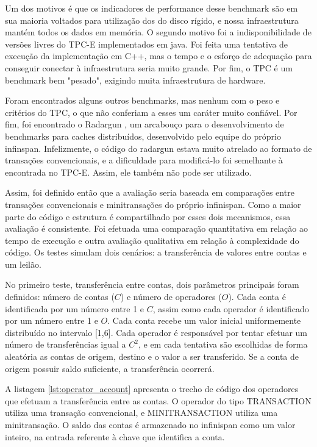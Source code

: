 \documentclass[11pt,twoside,a4paper]{book}
\begin{document}
Um dos motivos é que os indicadores de performance desse benchmark são em sua maioria voltados para utilização dos do disco rígido, e nossa infraestrutura mantém todos os dados em memória. O segundo motivo foi a indisponibilidade de versões livres do TPC-E implementados em java. Foi feita uma tentativa de execução da implementação em C++, mas o tempo e o esforço de adequação para conseguir conectar à infraestrutura seria muito grande. Por fim, o TPC é um benchmark bem "pesado", exigindo muita infraestrutura de hardware.

Foram encontrados alguns outros benchmarks, mas nenhum com o peso e critérios do TPC, o que não conferiam a esses um caráter muito confiável. Por fim, foi encontrado o Radargun \cite{radargun}, um arcabouço para o desenvolvimento de benchmarks para caches distribuídos, desenvolvido pelo equipe do próprio infinspan. Infelizmente, o código do radargun estava muito atrelado ao formato de transações convencionais, e a dificuldade para modificá-lo foi semelhante à encontrada no TPC-E. Assim, ele também não pode ser utilizado.

Assim, foi definido então que a avaliação seria baseada em comparações entre transações convencionais e minitransações do próprio infinispan. Como a maior parte do código e estrutura é compartilhado por esses dois mecanismos, essa avaliação é consistente. Foi efetuada uma comparação quantitativa em relação ao tempo de execução e outra avaliação qualitativa em relação à complexidade do código. Os testes simulam dois cenários: a transferência de valores entre contas e um leilão.

No primeiro teste, transferência entre contas, dois parâmetros principais foram definidos: número de contas ($C$) e número de operadores ($O$). Cada conta é identificada por um número entre 1 e $C$, assim como cada operador é identificado por um número entre 1 e $O$. Cada conta recebe um valor inicial uniformemente distribuído no intervalo [1,6]. Cada operador é responsável por tentar efetuar um número de transferências igual a $C^2$, e em cada tentativa são escolhidas de forma aleatória as contas de origem, destino e o valor a ser transferido. Se a conta de origem possuir saldo suficiente, a transferência ocorrerá.

A listagem \ref{lst:operator_account} apresenta o trecho de código dos operadores que efetuam a transferência entre as contas. O operador do tipo TRANSACTION utiliza uma transação convencional, e MINITRANSACTION utiliza uma minitransação. O saldo das contas é armazenado no infinispan como um valor inteiro, na entrada referente à chave que identifica a conta. 
\end{document}
